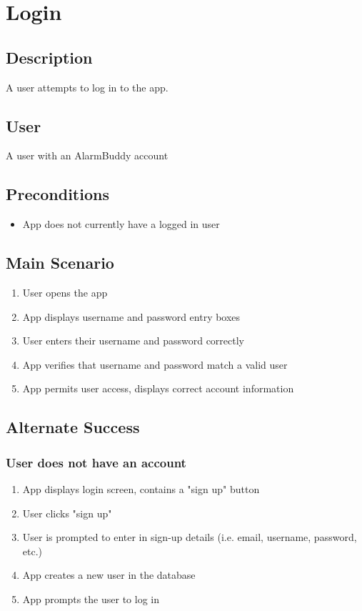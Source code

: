 \documentclass{article}
\begin{document}
\section{Login}
	\subsection{Description}
	A user attempts to log in to the app.

	\subsection{User}
	A user with an AlarmBuddy account

	\subsection{Preconditions}
		\begin{itemize}
			\item App does not currently have a logged in user
		\end{itemize}

	\subsection{Main Scenario}
		\begin{enumerate}
			\item User opens the app
			\item App displays username and password entry boxes
			\item User enters their username and password correctly
			\item App verifies that username and password match a valid user
			\item App permits user access, displays correct account information
		\end{enumerate}

	\subsection{Alternate Success}
		\subsubsection{User does not have an account}
			\begin{enumerate}
				\item App displays login screen, contains a "sign up" button
				\item User clicks "sign up"
				\item User is prompted to enter in sign-up details (i.e. email, username, password, etc.)
				\item App creates a new user in the database
				\item App prompts the user to log in
			\end{enumerate}
\end{document}
